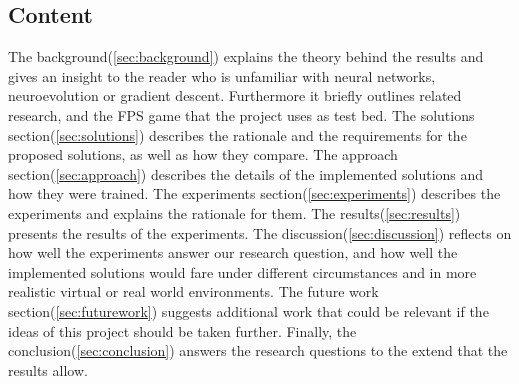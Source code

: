 \subsection{Content}
The background(\ref{sec:background}) explains the theory behind the results and gives an insight to the reader who is unfamiliar with neural networks, neuroevolution or gradient descent. Furthermore it briefly outlines related research, and the FPS game that the project uses as test bed. The solutions section(\ref{sec:solutions}) describes the rationale and the requirements for the proposed solutions, as well as how they compare. The approach section(\ref{sec:approach}) describes the details of the implemented solutions and how they were trained. The experiments section(\ref{sec:experiments}) describes the experiments and explains the rationale for them. The results(\ref{sec:results}) presents the results of the experiments. The discussion(\ref{sec:discussion}) reflects on how well the experiments answer our research question, and how well the implemented solutions would fare under different circumstances and in more realistic virtual or real world environments. The future work section(\ref{sec:futurework}) suggests additional work that could be relevant if the ideas of this project should be taken further. Finally, the conclusion(\ref{sec:conclusion}) answers the research questions to the extend that the results allow.


























